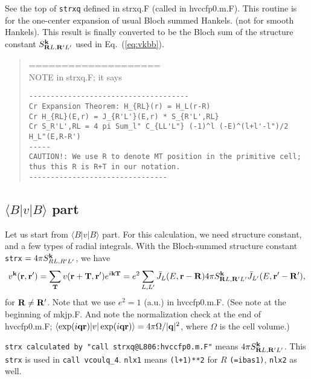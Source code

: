\documentclass[a4paper,10pt,epsf,fleqn]{article}
\newcommand{\bfq}{{\bf q}}
\newcommand{\bfk}{{\bf k}}
\newcommand{\bfr}{{\bf r}}
\newcommand{\bfT}{{\bf T}}
\newcommand{\bfR}{{\bf R}}
\newcommand{\req}[1]{\mbox{Eq.~(\ref{#1})}}
\begin{document}
See the top of \verb#strxq# defined in strxq.F (called in hvccfp0.m.F). 
This routine is for the one-center expansion of 
usual Bloch summed Hankels. (not for smooth Hankels).
This result is finally converted to be the 
Bloch sum of the structure constant 
$S^{\bfk}_{\bfR{L},\bfR'{L'}}$ used in \req{eq:vkbb}.

\begin{quote}
====================\\
NOTE in strxq.F; it says
\begin{verbatim}
-------------------------------------
Cr Expansion Theorem: H_{RL}(r) = H_L(r-R)
Cr H_{RL}(E,r) = J_{R'L'}(E,r) * S_{R'L',RL}
Cr S_R'L',RL = 4 pi Sum_l" C_{LL'L"} (-1)^l (-E)^(l+l'-l")/2 H_L"(E,R-R')
-----
CAUTION!: We use R to denote MT position in the primitive cell; 
thus this R is R+T in our notation.
--------------------------------
\end{verbatim}
\end{quote}

%
%
%


\subsection{$\langle B|v|B \rangle$ part}
\label{sec:bvbpart}
Let us start from $\langle B|v|B \rangle$ part.
For this calculation, we need structure constant, and a few types of
radial integrals.
With the Bloch-summed structure constant \verb!strx!
$=4 \pi S^\bfk_{RL,R'L'}$, we have
\begin{eqnarray}
v^\bfk(\bfr,\bfr')
=\sum_{\bfT} v(\bfr+\bfT,\bfr') e^{i \bfk \bfT}
=e^2 \sum_{L,L'} 
{\bar{J}_L(E,\bfr-\bfR)}
4 \pi S^{\bfk}_{\bfR{L},\bfR'{L'}}
{\bar{J}_{L'}(E,\bfr'-\bfR')},
\label{eq:vkbb}
\end{eqnarray}
for $\bfR \ne \bfR'$.
Note that we use $e^2=1$ (a.u.) in hvccfp0.m.F.
(See note at the beginning of mkjp.F. And note the normalization check
at the end of hvccfp0.m.F; $\langle \exp(i \bfq \bfr) |v |\exp(i \bfq \bfr)\rangle=4\pi \Omega/|\bfq|^2$, where $\Omega$ is the cell volume.)

\verb#strx calculated by "call strxq@L806:hvccfp0.m.F"# 
means $4 \pi S^\bfk_{\bfR{L},\bfR'L'}$. 
This \verb!strx! is used in  \verb!call vcoulq_4!. 
\verb#nlx1# means \verb#(l+1)**2# for $R$ 
\verb#(=ibas1)#, \verb#nlx2# as well.
\end{document}
